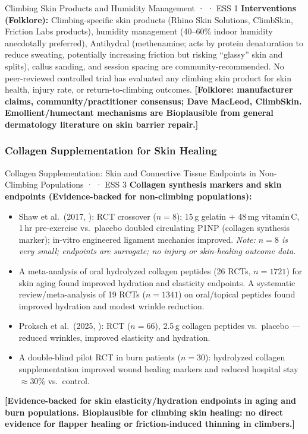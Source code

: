 \begin{folklorebox}{Climbing Skin Products and Humidity Management · \folkloreverified · ESS 1}
\textbf{Interventions (Folklore):} Climbing-specific skin products (Rhino Skin Solutions, ClimbSkin, Friction Labs products), humidity management (40--60\% indoor humidity anecdotally preferred), Antihydral (methenamine; acts by protein denaturation to reduce sweating, potentially increasing friction but risking ``glassy'' skin and splits), callus sanding, and session spacing are community-recommended. No peer-reviewed controlled trial has evaluated any climbing skin product for skin health, injury rate, or return-to-climbing outcomes. \textbf{[Folklore: manufacturer claims, community/practitioner consensus; Dave MacLeod, ClimbSkin. Emollient/humectant mechanisms are Bioplausible from general dermatology literature on skin barrier repair.]}
\end{folklorebox}

\subsubsection{Collagen Supplementation for Skin Healing}

\begin{evidencebox}{Collagen Supplementation: Skin and Connective Tissue Endpoints in Non-Climbing Populations · \evidencebacked · ESS 3}
\textbf{Collagen synthesis markers and skin endpoints (Evidence-backed for non-climbing populations):}
\begin{itemize}[leftmargin=1.5em]
  \item Shaw et al.\ (2017, \cite{SLBR+17}): RCT crossover ($n=8$); 15\,g gelatin + 48\,mg vitamin\,C, 1\,hr pre-exercise vs.\ placebo doubled circulating P1NP (collagen synthesis marker); in-vitro engineered ligament mechanics improved. \textit{Note: $n=8$ is very small; endpoints are surrogate; no injury or skin-healing outcome data.}
  \item A meta-analysis of oral hydrolyzed collagen peptides (26 RCTs, $n=1721$) for skin aging found improved hydration and elasticity endpoints. A systematic review/meta-analysis of 19 RCTs ($n=1341$) on oral/topical peptides found improved hydration and modest wrinkle reduction.
  \item Proksch et al.\ (2025, \cite{PZO25}): RCT ($n=66$), 2.5\,g collagen peptides vs.\ placebo --- reduced wrinkles, improved elasticity and hydration.
  \item A double-blind pilot RCT in burn patients ($n=30$): hydrolyzed collagen supplementation improved wound healing markers and reduced hospital stay $\approx$30\% vs.\ control.\singlesource
\end{itemize}
\textbf{[Evidence-backed for skin elasticity/hydration endpoints in aging and burn populations. Bioplausible for climbing skin healing: no direct evidence for flapper healing or friction-induced thinning in climbers.]}
\end{evidencebox}


